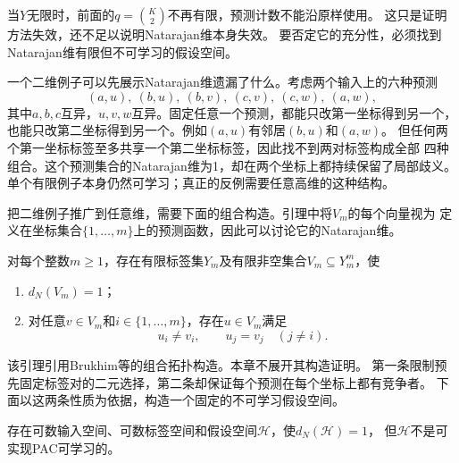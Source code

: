 当$Y$无限时，前面的$q=\binom K2$不再有限，预测计数不能沿原样使用。
这只是证明方法失效，还不足以说明Natarajan维本身失效。
要否定它的充分性，必须找到Natarajan维有限但不可学习的假设空间。

一个二维例子可以先展示Natarajan维遗漏了什么。考虑两个输入上的六种预测
\[
 (a,u),\ (b,u),\ (b,v),\ (c,v),\ (c,w),\ (a,w),
\]
其中$a,b,c$互异，$u,v,w$互异。固定任意一个预测，都能只改第一坐标得到另一个，
也能只改第二坐标得到另一个。例如$(a,u)$有邻居$(b,u)$和$(a,w)$。
但任何两个第一坐标标签至多共享一个第二坐标标签，因此找不到两对标签构成全部
四种组合。这个预测集合的Natarajan维为1，却在两个坐标上都持续保留了局部歧义。
单个有限例子本身仍然可学习；真正的反例需要任意高维的这种结构。

把二维例子推广到任意维，需要下面的组合构造。引理中将$V_m$的每个向量视为
定义在坐标集合$\{1,\ldots,m\}$上的预测函数，因此可以讨论它的Natarajan维。

\begin{lemma}[低Natarajan维的局部邻接构造]
\label{lem:low-natarajan-pseudocubes}
对每个整数$m\geq1$，存在有限标签集$Y_m$及有限非空集合$V_m\subseteq Y_m^m$，使
\begin{enumerate}
 \item $d_N(V_m)=1$；
 \item 对任意$v\in V_m$和$i\in\{1,\ldots,m\}$，存在$u\in V_m$满足
 \[
 u_i\neq v_i,\qquad u_j=v_j\quad(j\neq i).
 \]
\end{enumerate}
\end{lemma}

该引理引用Brukhim等的组合拓扑构造。本章不展开其构造证明。
第一条限制预先固定标签对的二元选择，第二条却保证每个预测在每个坐标上都有竞争者。
下面以这两条性质为依据，构造一个固定的不可学习假设空间。

\begin{theorem}[无限标签下有限Natarajan维并不充分]
\label{thm:natarajan-infinite-counterexample}
存在可数输入空间、可数标签空间和假设空间$\mathcal H$，使$d_N(\mathcal H)=1$，
但$\mathcal H$不是可实现PAC可学习的。
\end{theorem}

